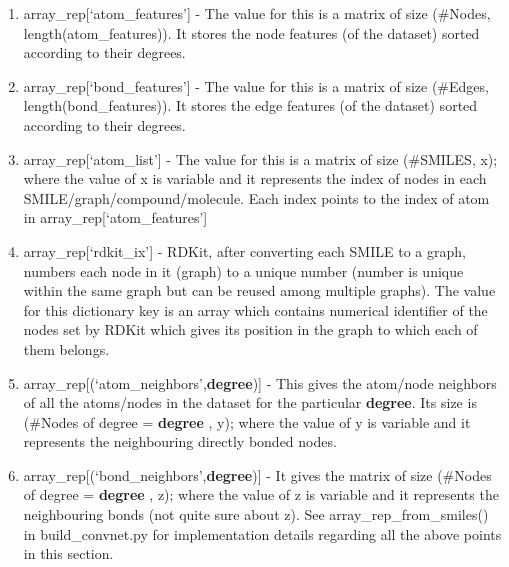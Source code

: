 \documentclass[10pt,a4paper,Times new roman]{report}
\begin{document}
\begin{enumerate}

\item array\_rep[`atom\_features'] - The value for this is a matrix of size (\#Nodes, length(atom\_features)). It stores the node features (of the dataset) sorted according to their degrees.

\item array\_rep[`bond\_features'] - The value for this is a matrix of size (\#Edges, length(bond\_features)). It stores the edge features (of the dataset) sorted according to their degrees.

\item array\_rep[`atom\_list'] - The value for this is a matrix of size (\#SMILES, x); where the value of x is variable and it  represents the index of nodes in each SMILE/graph/compound/molecule. Each index points to the index of atom in array\_rep[`atom\_features']

\item array\_rep[`rdkit\_ix'] - RDKit, after converting each SMILE to a graph, numbers each node in it (graph) to a unique number (number is unique within the same graph but can be reused among multiple graphs). The value for this dictionary key is an array which contains numerical identifier of the nodes set by RDKit which gives its position in the graph to which each of them belongs.

\item array\_rep[(`atom\_neighbors',\textbf{degree})] - This gives the atom/node neighbors of all the atoms/nodes in the dataset for the  particular \textbf{degree}. Its size is (\#Nodes of degree = \textbf{degree} , y); where the value of y is variable and it represents the neighbouring directly bonded nodes.

\item array\_rep[(`bond\_neighbors',\textbf{degree})] - It gives the matrix of size (\#Nodes of degree = \textbf{degree} , z); where the value of z is variable and it represents the neighbouring bonds (not quite sure about z). See array\_rep\_from\_smiles() in build\_convnet.py for implementation details regarding all the above points in this section. 

\end{enumerate}

 
\end{document}
